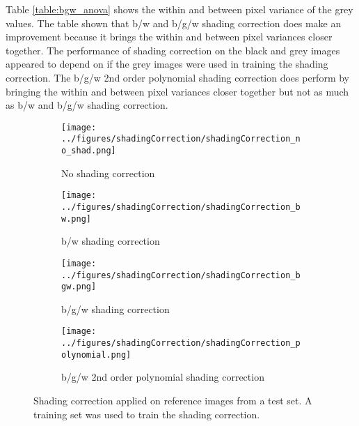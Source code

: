 \documentclass[a4paper]{proc}
\begin{document}
Table \ref{table:bgw_anova} shows the within and between pixel variance of the grey values. The table shown that b/w and b/g/w shading correction does make an improvement because it brings the within and between pixel variances closer together. The performance of shading correction on the black and grey images appeared to depend on if the grey images were used in training the shading correction. The b/g/w 2nd order polynomial shading correction does perform by bringing the within and between pixel variances closer together but not as much as b/w and b/g/w shading correction.

\begin{figure*}
	\centering
	\begin{subfigure}{\textwidth}
		\centering
		\texttt{[image: ../figures/shadingCorrection/shadingCorrection\_no\_shad.png]}
		\caption{No shading correction}
	\end{subfigure}
	\begin{subfigure}{\textwidth}
		\centering
		\texttt{[image: ../figures/shadingCorrection/shadingCorrection\_bw.png]}
		\caption{b/w shading correction}
	\end{subfigure}
	\begin{subfigure}{\textwidth}
		\centering
		\texttt{[image: ../figures/shadingCorrection/shadingCorrection\_bgw.png]}
		\caption{b/g/w shading correction}
	\end{subfigure}
		\begin{subfigure}{\textwidth}
		\centering
		\texttt{[image: ../figures/shadingCorrection/shadingCorrection\_polynomial.png]}
		\caption{b/g/w 2nd order polynomial shading correction}
	\end{subfigure}
	\caption{Shading correction applied on reference images from a test set. A training set was used to train the shading correction.}
	\label{fig:shadingCorr_bgw}
\end{figure*}
\end{document}
